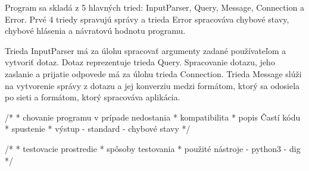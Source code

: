 Program sa skladá z 5 hlavných tried: InputParser, Query, Message, Connection a Error. Prvé 4 triedy spravujú správy a trieda Error spracováva chybové stavy, chybové hlásenia a návratovú hodnotu programu.

Trieda InputParser má za úlohu spracovať argumenty zadané používateľom a vytvoriť dotaz. Dotaz reprezentuje trieda Query.
Spracovanie dotazu, jeho zaslanie a prijatie odpovede má za úlohu trieda Connection. Trieda Message slúži na vytvorenie správy z dotazu a jej konverziu medzi 
formátom, ktorý sa odosiela po sieti a formátom, ktorý spracováva aplikácia.


/*
 * chovanie programu v prípade nedostania
 * kompatibilita
 * popis Častí kódu 
 * spustenie
 * výstup   - standard
            - chybové stavy
 */



/*
 * testovacie prostredie
 * spôsoby testovania
 * použité nástroje - python3
                    - dig 
 */



